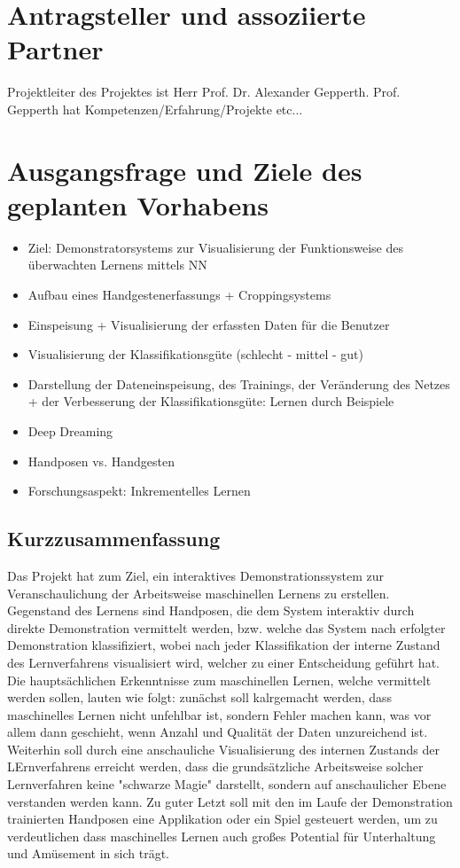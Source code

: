 \documentclass{article}
\begin{document}
\renewcommand{\thesection}{2}
\section{Antragsteller und assoziierte Partner}
Projektleiter des Projektes ist Herr Prof. Dr. Alexander Gepperth. Prof. Gepperth hat Kompetenzen/Erfahrung/Projekte etc...

\renewcommand{\thesection}{3}
\section{Ausgangsfrage und Ziele des geplanten Vorhabens}

\begin{itemize}
	\item Ziel: Demonstratorsystems zur Visualisierung der Funktionsweise des überwachten Lernens mittels NN
	\item Aufbau eines Handgestenerfassungs + Croppingsystems
	\item Einspeisung + Visualisierung der erfassten Daten für die Benutzer
	\item Visualisierung der Klassifikationsgüte (schlecht - mittel - gut)
	\item Darstellung der Dateneinspeisung, des Trainings, der Veränderung des Netzes + der Verbesserung der Klassifikationsgüte: Lernen durch Beispiele
	\item Deep Dreaming
	\item Handposen vs. Handgesten
	\item Forschungsaspekt: Inkrementelles Lernen

\end{itemize}


\subsection{Kurzzusammenfassung}
Das Projekt hat zum Ziel, ein interaktives Demonstrationssystem zur Veranschaulichung der Arbeitsweise maschinellen Lernens zu erstellen. 
Gegenstand des Lernens sind Handposen, die dem System interaktiv durch direkte Demonstration vermittelt werden, bzw. welche das System nach
erfolgter Demonstration klassifiziert, wobei nach jeder Klassifikation der interne Zustand des Lernverfahrens visualisiert wird, welcher zu einer Entscheidung geführt hat. 
Die hauptsächlichen Erkenntnisse zum maschinellen Lernen, welche vermittelt werden sollen, lauten wie folgt: zunächst soll kalrgemacht werden, dass maschinelles Lernen nicht unfehlbar ist, sondern
Fehler machen kann, was vor allem dann geschieht, wenn Anzahl und Qualität der Daten unzureichend ist. Weiterhin soll durch eine anschauliche Visualisierung des internen Zustands der LErnverfahrens erreicht werden, dass die grundsätzliche Arbeitsweise solcher Lernverfahren keine "schwarze Magie" darstellt, sondern auf anschaulicher Ebene  verstanden werden kann. 
Zu guter Letzt soll mit den im Laufe der Demonstration trainierten Handposen eine Applikation oder ein Spiel gesteuert werden, um zu verdeutlichen dass maschinelles Lernen auch großes Potential
für Unterhaltung und Amüsement in sich trägt. 
%
\end{document}
